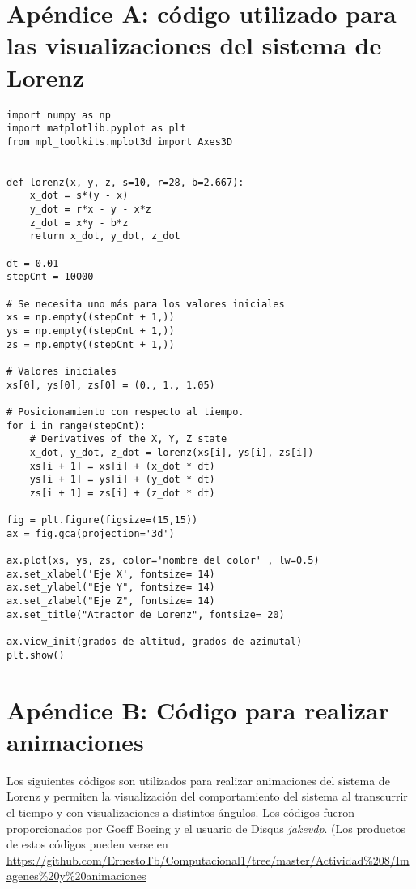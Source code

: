\section*{Apéndice A: código utilizado para las visualizaciones del sistema de Lorenz}
\begin{verbatim}
import numpy as np
import matplotlib.pyplot as plt
from mpl_toolkits.mplot3d import Axes3D


def lorenz(x, y, z, s=10, r=28, b=2.667):
    x_dot = s*(y - x)
    y_dot = r*x - y - x*z
    z_dot = x*y - b*z
    return x_dot, y_dot, z_dot

dt = 0.01
stepCnt = 10000

# Se necesita uno más para los valores iniciales
xs = np.empty((stepCnt + 1,))
ys = np.empty((stepCnt + 1,))
zs = np.empty((stepCnt + 1,))

# Valores iniciales
xs[0], ys[0], zs[0] = (0., 1., 1.05)

# Posicionamiento con respecto al tiempo.
for i in range(stepCnt):
    # Derivatives of the X, Y, Z state
    x_dot, y_dot, z_dot = lorenz(xs[i], ys[i], zs[i])
    xs[i + 1] = xs[i] + (x_dot * dt)
    ys[i + 1] = ys[i] + (y_dot * dt)
    zs[i + 1] = zs[i] + (z_dot * dt)

fig = plt.figure(figsize=(15,15))
ax = fig.gca(projection='3d')

ax.plot(xs, ys, zs, color='nombre del color' , lw=0.5)
ax.set_xlabel('Eje X', fontsize= 14)
ax.set_ylabel("Eje Y", fontsize= 14)
ax.set_zlabel("Eje Z", fontsize= 14)
ax.set_title("Atractor de Lorenz", fontsize= 20)

ax.view_init(grados de altitud, grados de azimutal)
plt.show()
\end{verbatim}
\pagebreak
\newpage

\section*{Apéndice B: Código para realizar animaciones}
Los siguientes códigos son utilizados para realizar animaciones del sistema de Lorenz y permiten la visualización del comportamiento del sistema al transcurrir el tiempo y con visualizaciones a distintos ángulos. Los códigos fueron proporcionados por Goeff Boeing y el usuario de Disqus \textit{jakevdp}. (Los productos de estos códigos pueden verse en \url{https://github.com/ErnestoTb/Computacional1/tree/master/Actividad\%208/Imagenes\%20y\%20animaciones}

